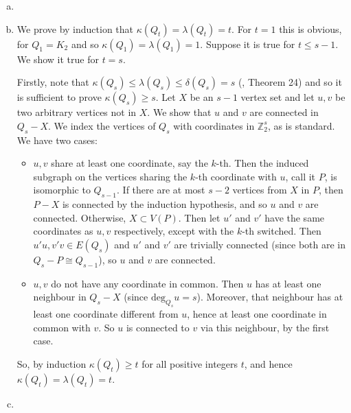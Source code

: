 \begin{enumerate}[(a)]
\item
\item We prove by induction that $\kappa(Q_t)=\lambda(Q_t)=t$. For
	$t=1$ this is obvious, for $Q_1=K_2$ and so $\kappa(Q_1)=\lambda(Q_1)=1$.
	Suppose it is true for $t\le s-1$. We show it true for $t=s$.

	Firstly, note that $\kappa(Q_s)\le\lambda(Q_s)\le \delta(Q_s)=s$ (\cite{notes}, Theorem 24)
	and so it is sufficient to prove $\kappa(Q_s)\ge s$. Let $X$ be an $s-1$ vertex
	set and let $u,v$ be two arbitrary vertices not in $X$. We show that $u$ and $v$
	are connected in $Q_s-X$. We index the vertices of $Q_s$ with coordinates in
	$\mathbb{Z}_2^s$, as is standard. We have two cases:
	\begin{itemize}
		\item $u,v$ share at least one coordinate, say the $k$-th. Then the induced
			subgraph on the vertices sharing the $k$-th coordinate with $u$, call it $P$, 
			is isomorphic to $Q_{s-1}$.
			If there are at most $s-2$ vertices from $X$ in $P$, then $P-X$ is connected
			by the induction hypothesis, and so $u$ and $v$ are connected.
			Otherwise, $X \subset V(P)$. Then let $u'$ and $v'$ have the same coordinates
			as $u,v$ respectively, except with the $k$-th switched. Then 
			$u'u,v'v \in E(Q_s)$ and $u'$ and $v'$ are trivially connected (since both are
			in $Q_s-P \cong Q_{s-1}$), so $u$ and $v$ are connected.
		\item $u,v$ do not have any coordinate in common. Then $u$ has at least one neighbour
			in $Q_s-X$ (since $\text{deg}_{Q_s} u = s$). Moreover, that neighbour has at
			least one coordinate different from $u$, hence at least one coordinate in common
			with $v$. So $u$ is connected to $v$ via this neighbour, by the first case.
	\end{itemize}
	So, by induction $\kappa(Q_t) \ge t$ for all positive integers $t$, and hence
	$\kappa(Q_t)=\lambda(Q_t)=t$.
\item
\end{enumerate}
